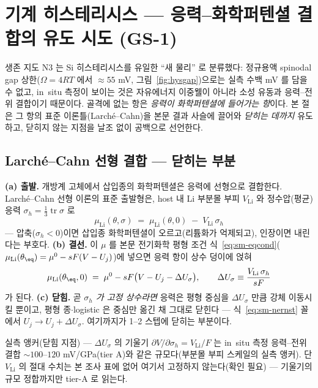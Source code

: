 \section{기계 히스테리시스 --- 응력--화학퍼텐셜 결합의 유도 시도 (GS-1)}\label{sec:si-mech}
생존 지도 N3 는 Si 히스테리시스를 유일한 ``새 물리'' 로 분류했다: 정규용액 spinodal gap 상한($\Omega{=}4RT$
에서 $\approx55$ mV, 그림~\ref{fig:hysgap})으로는 실측 수백 mV 를 담을 수 없고, in~situ 측정이 보이는 것은
자유에너지 이중웰이 아니라 소성 유동과 응력--전위 결합이기 때문이다\cite{sethuraman_stressevo2010,
sethuraman_stresspot2010}. 골격에 없는 항은 \emph{응력이 화학퍼텐셜에 들어가는 항}이다. 본 절은 그 항의
표준 이론틀(Larché--Cahn)을 본문 결과 사슬에 끌어와 \emph{닫히는 데까지} 유도하고, 닫히지 않는 지점을
날조 없이 공백으로 선언한다.

\subsection{Larché--Cahn 선형 결합 --- 닫히는 부분}\label{ssec:si-lc}
\textbf{(a) 출발.} 개방계 고체에서 삽입종의 화학퍼텐셜은 응력에 선형으로 결합한다. Larché--Cahn 선형
이론\cite{larchecahn1973}의 표준 출발형은, host 내 Li 부분몰 부피 $V_\mathrm{Li}$ 와 정수압(평균) 응력
$\sigma_h=\tfrac13\operatorname{tr}\sigma$ 로
\begin{equation}
\mu_\mathrm{Li}(\theta,\sigma)\;=\;\mu_\mathrm{Li}(\theta,0)\;-\;V_\mathrm{Li}\,\sigma_h
\label{eq:si-lc-mu}
\end{equation}
--- 압축($\sigma_h<0$)이면 삽입종 화학퍼텐셜이 오르고(리튬화가 억제되고), 인장이면 내린다는 부호다.
\textbf{(b) 결선.} 이 $\mu$ 를 본문 전기화학 평형 조건 식~\eqref{eq:sm-eqcond}($\mu_\mathrm{Li}(\theta_\eq)=\mu^0-sF(V-U_j)$)에
넣으면 응력 항이 상수 덩이에 얹혀
\begin{equation}
\mu_\mathrm{Li}(\theta_\eq,0)\;=\;\mu^0-sF\bigl(V-U_j-\Delta U_\sigma\bigr),
\qquad
\Delta U_\sigma\equiv\frac{V_\mathrm{Li}\,\sigma_h}{sF}
\label{eq:si-lc-shift}
\end{equation}
가 된다. \textbf{(c) 닫힘.} 곧 \emph{$\sigma_h$ 가 고정 상수라면} 응력은 평형 중심을 $\Delta U_\sigma$ 만큼
강체 이동시킬 뿐이고, 평형 종$\cdot$logistic 은 중심만 옮긴 채 그대로 닫힌다 --- 식~\eqref{eq:sm-nernst}
꼴에서 $U_j\to U_j+\Delta U_\sigma$. 여기까지가 1--2 스텝에 닫히는 부분이다.
\begin{srcbox}
실측 앵커(닫힘 지점) --- $\Delta U_\sigma$ 의 기울기 $\partial V/\partial\sigma_h=V_\mathrm{Li}/F$ 는
in~situ 측정 응력--전위 결합 $\sim100$--$120$ mV/GPa\cite{sethuraman_stresspot2010}(tier A)와 같은
규모다(부분몰 부피 스케일의 실측 앵커). 단 $V_\mathrm{Li}$ 의 절대 수치는 본 조사 표에 없어 여기서
고정하지 않는다(확인 필요) --- 기울기의 규모 정합까지만 tier-A 로 읽는다.
\end{srcbox}

